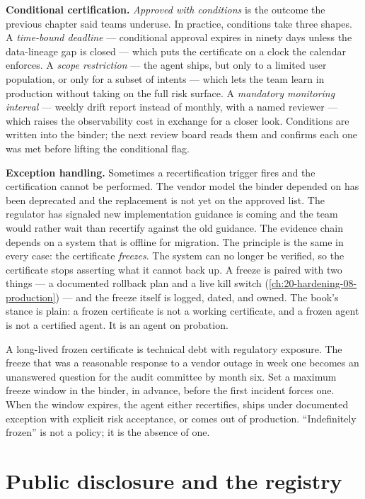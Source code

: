 \textbf{Conditional certification.} \textit{Approved with conditions} is the outcome the previous chapter said teams underuse. In practice, conditions take three shapes. A \textit{time-bound deadline} --- conditional approval expires in ninety days unless the data-lineage gap is closed --- which puts the certificate on a clock the calendar enforces. A \textit{scope restriction} --- the agent ships, but only to a limited user population, or only for a subset of intents --- which lets the team learn in production without taking on the full risk surface. A \textit{mandatory monitoring interval} --- weekly drift report instead of monthly, with a named reviewer --- which raises the observability cost in exchange for a closer look. Conditions are written into the binder; the next review board reads them and confirms each one was met before lifting the conditional flag.

\textbf{Exception handling.} Sometimes a recertification trigger fires and the certification cannot be performed. The vendor model the binder depended on has been deprecated and the replacement is not yet on the approved list. The regulator has signaled new implementation guidance is coming and the team would rather wait than recertify against the old guidance. The evidence chain depends on a system that is offline for migration. The principle is the same in every case: the certificate \textit{freezes}. The system can no longer be verified, so the certificate stops asserting what it cannot back up. A freeze is paired with two things --- a documented rollback plan and a live kill switch (\autoref{ch:20-hardening-08-production}) --- and the freeze itself is logged, dated, and owned. The book's stance is plain: a frozen certificate is not a working certificate, and a frozen agent is not a certified agent. It is an agent on probation.

\begin{TNwarning} A long-lived frozen certificate is technical debt with regulatory exposure. The freeze that was a reasonable response to a vendor outage in week one becomes an unanswered question for the audit committee by month six. Set a maximum freeze window in the binder, in advance, before the first incident forces one. When the window expires, the agent either recertifies, ships under documented exception with explicit risk acceptance, or comes out of production. ``Indefinitely frozen'' is not a policy; it is the absence of one. \end{TNwarning}

\section{Public disclosure and the registry}


